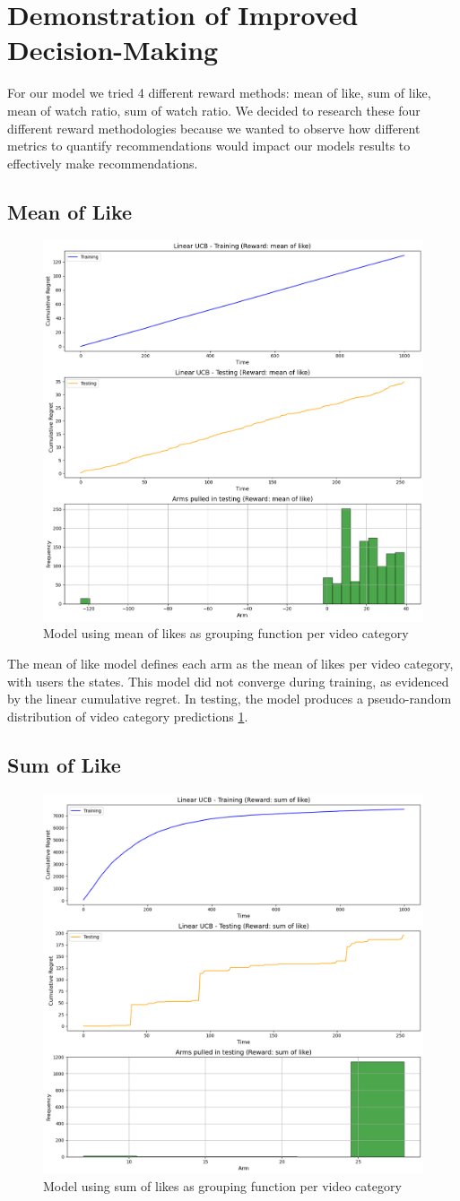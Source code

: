 \section{Demonstration of Improved Decision-Making}

For our model we tried 4 different reward methods: mean of like, sum of like, mean of watch ratio, sum of watch ratio. We decided to research these four different reward methodologies because we wanted to observe how different metrics to quantify recommendations would impact our models results to effectively make recommendations. 

\subsection{Mean of Like}

\begin{figure}
    \centering
    \includegraphics[width=0.5\linewidth]{mean_like.png}
    \caption{Model using mean of likes as grouping function per video category}
    \label{mean_like}
\end{figure}

The mean of like model defines each arm as the mean of likes per video category, with users the states. This model did not converge during training, as evidenced by the linear cumulative regret. In testing, the model produces a pseudo-random distribution of video category predictions \ref{mean_like}.

\subsection{Sum of Like}

\begin{figure}
    \centering
    \includegraphics[width=0.5\linewidth]{sum_like.png}
    \caption{Model using sum of likes as grouping function per video category}
    \label{sum_like}
\end{figure}

